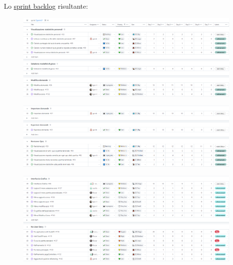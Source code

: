 Lo \href{https://github.com/orgs/ISIQuiz/projects/3/views/20}{sprint backlog} risultante:

\begin{figure}[H]
    \centering
    \includegraphics[width=\textwidth]{process/Img/Sprint9BL1.png}
    \label{fig:Sprint9BL1}
\end{figure}

\begin{figure}[H]
    \centering
    \includegraphics[width=\textwidth]{process/Img/Sprint9BL2.png}
    \label{fig:Sprint9BL2}
\end{figure}

\begin{figure}[H]
    \centering
    \includegraphics[width=\textwidth]{process/Img/Sprint9BL3.png}
    \label{fig:Sprint9BL3}
\end{figure}
